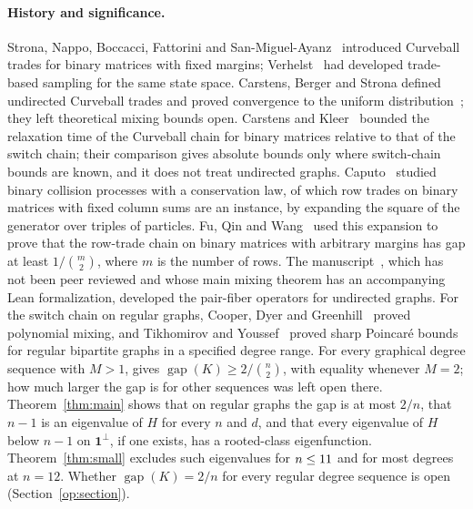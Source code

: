 \paragraph{History and significance.}
Strona, Nappo, Boccacci, Fattorini and San-Miguel-Ayanz~\cite{SNBFS14}
introduced Curveball trades for binary matrices with fixed margins;
Verhelst~\cite{Verhelst08} had developed trade-based sampling for the same
state space. Carstens, Berger and Strona defined undirected
Curveball trades and proved convergence to the uniform
distribution~\cite[Theorem~11]{CBS18}; they left theoretical mixing bounds
open. Carstens and Kleer~\cite{CK18} bounded the relaxation time of the
Curveball chain for binary matrices relative to that of the switch chain;
their comparison gives absolute bounds only where switch-chain bounds are
known, and it does not treat undirected graphs.
Caputo~\cite{Caputo08} studied binary collision processes with a conservation
law, of which row trades on binary matrices with fixed column sums are an
instance, by expanding the square of the generator over triples of particles.
Fu, Qin and Wang~\cite[Lemma~4.1 and Theorem~5.1]{FQW26} used this expansion
to prove that the row-trade chain on binary matrices with arbitrary margins
has gap at least $1/\binom m2$, where $m$ is the number of rows. The
manuscript~\cite{OAI26}, which has not been peer reviewed and whose main
mixing theorem has an accompanying Lean formalization, developed
the pair-fiber operators for undirected graphs.
For the switch chain on regular graphs, Cooper, Dyer and
Greenhill~\cite{CDG07,CDG12} proved polynomial mixing, and Tikhomirov and
Youssef~\cite{TY23} proved sharp Poincar\'e bounds for regular bipartite graphs
in a specified degree range. For every graphical degree sequence with $M>1$,
\cite[Theorem~1.1]{S26} gives $\operatorname{gap}(K)\ge2/\binom n2$, with
equality whenever $M=2$; how much larger the gap is for other
sequences was left open there. Theorem~\ref{thm:main} shows that on regular
graphs the gap is at most $2/n$, that $n-1$ is an eigenvalue of $H$ for every
$n$ and $d$, and that every eigenvalue of $H$ below $n-1$ on $\mathbf1^\perp$,
if one exists, has a rooted-class eigenfunction. Theorem~\ref{thm:small}
excludes such eigenvalues for $n\le11$ and for most degrees at $n=12$. Whether
$\operatorname{gap}(K)=2/n$ for every regular degree sequence is open
(Section~\ref{op:section}).

